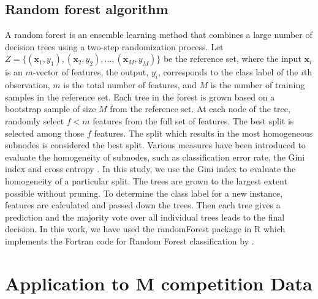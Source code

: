\documentclass[11pt,a4paper,]{article}
\theoremstyle{definition}
\theoremstyle{definition}
\theoremstyle{definition}
\theoremstyle{remark}
\begin{document}
\subsection{Random forest algorithm}\label{random-forest-algorithm}

A random forest \autocite{breiman2001random} is an ensemble learning
method that combines a large number of decision trees using a two-step
randomization process. Let
\(Z=\{(\bm{x}_1, y_1), (\bm{x}_2, y_2), \dots, (\bm{x}_M, y_M)\}\) be
the reference set, where the input \(\bm{x}_i\) is an \(m\)-vector of
features, the output, \(y_i\), corresponds to the class label of the
\(i\)th observation, \(m\) is the total number of features, and \(M\) is
the number of training samples in the reference set. Each tree in the
forest is grown based on a bootstrap sample of size \(M\) from the
reference set. At each node of the tree, randomly select \(f<m\)
features from the full set of features. The best split is selected among
those \(f\) features. The split which results in the most homogeneous
subnodes is considered the best split. Various measures have been
introduced to evaluate the homogeneity of subnodes, such as
classification error rate, the Gini index and cross entropy
\autocite{friedman2001elements}. In this study, we use the Gini index to
evaluate the homogeneity of a particular split. The trees are grown to
the largest extent possible without pruning. To determine the class
label for a new instance, features are calculated and passed down the
trees. Then each tree gives a prediction and the majority vote over all
individual trees leads to the final decision. In this work, we have used
the randomForest package \autocite{liaw2002randomforest} in R
\autocite{Rcore} which implements the Fortran code for Random Forest
classification by \textcite{breiman2004random}.

\section{Application to M competition Data}\label{Mcomp}
\end{document}
